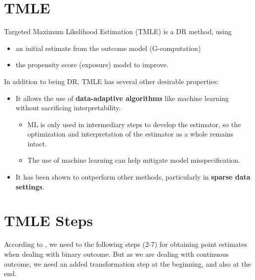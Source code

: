 \documentclass[
]{book}
\providecommand{\tightlist}{%
  \setlength{\itemsep}{0pt}\setlength{\parskip}{0pt}}
\begin{document}
\hypertarget{tmle-1}{%
\section{TMLE}\label{tmle-1}}

Targeted Maximum Likelihood Estimation (TMLE) is a DR method, using

\begin{itemize}
\tightlist
\item
  an initial estimate from the outcome model (G-computation)
\item
  the propensity score (exposure) model to improve.
\end{itemize}

In addition to being DR, TMLE has several other desirable properties:

\begin{itemize}
\tightlist
\item
  It allows the use of \textbf{data-adaptive algorithms} like machine learning without sacrificing interpretability.

  \begin{itemize}
  \tightlist
  \item
    ML is only used in intermediary steps to develop the estimator, so the optimization and interpretation of the estimator as a whole remains intact.
  \item
    The use of machine learning can help mitigate model misspecification.
  \end{itemize}
\item
  It has been shown to outperform other methods, particularly in \textbf{sparse data settings}.
\end{itemize}

\hypertarget{tmle-steps}{%
\section{TMLE Steps}\label{tmle-steps}}

According to \citet{luque2018targeted}, we need to the following steps (2-7) for obtaining point estimates when dealing with binary outcome. But as we are dealing with continuous outcome, we need an added transformation step at the beginning, and also at the end.
\end{document}
